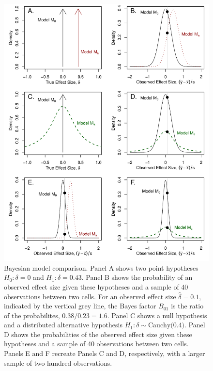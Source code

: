\documentclass[man]{apa6}
\begin{document}

\begin{figure}
\includegraphics[width=\textwidth, keepaspectratio]{BFfigure.pdf}
\caption{Bayesian model comparison. Panel A shows two point hypotheses $H_0: \delta = 0$ and $H_1: \delta=0.43$. Panel B shows the probability of an observed effect size given these hypotheses and a sample of 40 observations between two cells. For an observed effect size $\hat{\delta} = 0.1$, indicated by the vertical grey line, the Bayes factor $B_{01}$ is the ratio of the probabilites, $0.38 / 0.23 = 1.6$. Panel C shows a null hypothesis and a distributed alternative hypothesis $H_1: \delta \sim \mbox{Cauchy(0.4)}$. Panel D shows the probabilities of the observed effect size given these hypotheses and a sample of 40 observations between two cells. Panels E and F recreate Panels C and D, respectively, with a larger sample of two hundred observations.}
\label{BFfig}
\end{figure}
\end{document}
